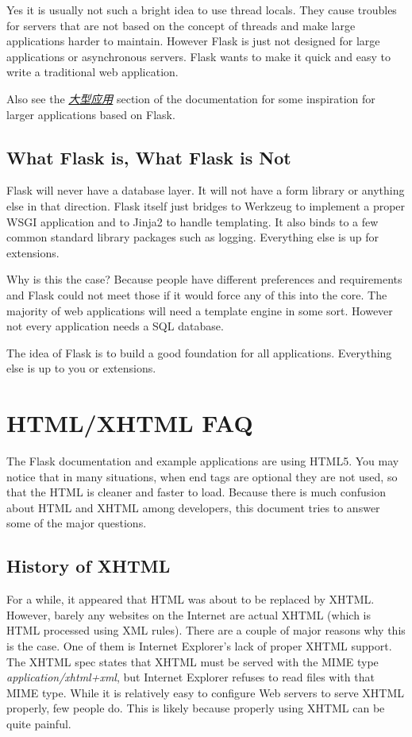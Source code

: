 \documentclass[a4paper,12pt]{sphinxmanual}
\begin{document}
Yes it is usually not such a bright idea to use thread locals.  They cause
troubles for servers that are not based on the concept of threads and make
large applications harder to maintain.  However Flask is just not designed
for large applications or asynchronous servers.  Flask wants to make it
quick and easy to write a traditional web application.

Also see the {\hyperref[becomingbig:becomingbig]{\emph{大型应用}}} section of the documentation for some
inspiration for larger applications based on Flask.


\section{What Flask is, What Flask is Not}
\label{design:what-flask-is-what-flask-is-not}
Flask will never have a database layer.  It will not have a form library
or anything else in that direction.  Flask itself just bridges to Werkzeug
to implement a proper WSGI application and to Jinja2 to handle templating.
It also binds to a few common standard library packages such as logging.
Everything else is up for extensions.

Why is this the case?  Because people have different preferences and
requirements and Flask could not meet those if it would force any of this
into the core.  The majority of web applications will need a template
engine in some sort.  However not every application needs a SQL database.

The idea of Flask is to build a good foundation for all applications.
Everything else is up to you or extensions.


\chapter{HTML/XHTML FAQ}
\label{htmlfaq::doc}\label{htmlfaq:html-xhtml-faq}
The Flask documentation and example applications are using HTML5.  You
may notice that in many situations, when end tags are optional they are
not used, so that the HTML is cleaner and faster to load.  Because there
is much confusion about HTML and XHTML among developers, this document tries
to answer some of the major questions.


\section{History of XHTML}
\label{htmlfaq:history-of-xhtml}
For a while, it appeared that HTML was about to be replaced by XHTML.
However, barely any websites on the Internet are actual XHTML (which is
HTML processed using XML rules).  There are a couple of major reasons
why this is the case.  One of them is Internet Explorer's lack of proper
XHTML support. The XHTML spec states that XHTML must be served with the MIME
type \emph{application/xhtml+xml}, but Internet Explorer refuses to read files
with that MIME type.
While it is relatively easy to configure Web servers to serve XHTML properly,
few people do.  This is likely because properly using XHTML can be quite
painful.
\end{document}
